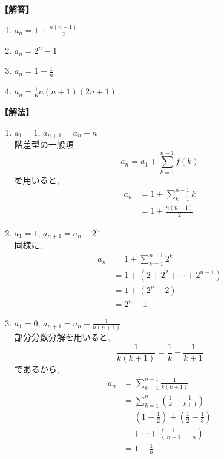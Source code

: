       \noindent\textbf{【解答】}
      \begin{enumerate}[label=(\arabic*),parsep=3pt]
        \item $\displaystyle a_n=1+\frac{n(n-1)}{2}$
        \item $\displaystyle a_n=2^n-1$
        \item $\displaystyle a_n=1-\frac{1}{n}$
        \item $\displaystyle a_n=\frac{1}{6}n(n+1)(2n+1)$
      \end{enumerate}

      \noindent\textbf{【解法】}
      \begin{enumerate}[label=(\arabic*),parsep=3pt]
        \item $\displaystyle a_1=1,\,a_{n+1}=a_n+n$\\
              階差型の一般項
              \[
                a_n=a_1+\sum_{k=1}^{n-1}f(k)
              \]
              を用いると,
              \begin{align*}
                a_n
                  &=1+\sum_{k=1}^{n-1}k\\
                  &=1+\frac{n(n-1)}{2}
              \end{align*}

        \item $\displaystyle a_1=1,\,a_{n+1}=a_n+2^n$\\
              同様に,
              \begin{align*}
                a_n
                  &=1+\sum_{k=1}^{n-1}2^k\\
                  &=1+(2+2^2+\cdots+2^{n-1})\\
                  &=1+(2^n-2)\\
                  &=2^n-1
              \end{align*}

        \item $\displaystyle a_1=0,\,a_{n+1}=a_n+\frac{1}{n(n+1)}$\\
              部分分数分解を用いると,
              \[
                \frac{1}{k(k+1)}
                =\frac{1}{k}-\frac{1}{k+1}
              \]
              であるから,
              \begin{align*}
                a_n
                  &=\sum_{k=1}^{n-1}\frac{1}{k(k+1)}\\
                  &=\sum_{k=1}^{n-1}
                    \left(\frac{1}{k}-\frac{1}{k+1}\right)\\
                  &=\left(1-\frac12\right)
                    +\left(\frac12-\frac13\right)\\
                  &\quad +\cdots+\left(\frac{1}{n-1}-\frac1n\right)\\
                  &=1-\frac1n
              \end{align*}


\end{enumerate}

